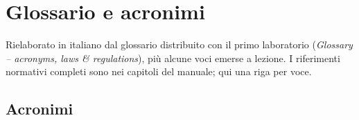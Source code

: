 \chapter{Glossario e acronimi}
\label{app:glossario}

\begin{nota}[Fonte]
Rielaborato in italiano dal glossario distribuito con il primo laboratorio (\emph{Glossary -- acronyms,
laws \& regulations}), più alcune voci emerse a lezione. I riferimenti normativi completi sono nei
capitoli del manuale; qui una riga per voce.
\end{nota}

\section{Acronimi}
